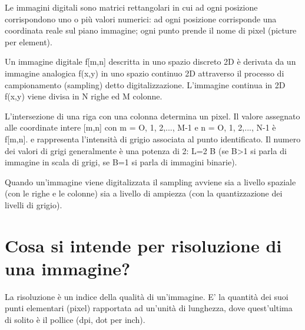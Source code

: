 Le immagini digitali sono matrici rettangolari in cui ad ogni posizione corrispondono uno o più valori numerici: ad ogni posizione corrisponde una coordinata reale sul piano immagine; ogni punto prende il nome di pixel (picture per element).

Un immagine digitale f[m,n] descritta in uno spazio discreto 2D è derivata da un immagine analogica f(x,y) in uno spazio continuo 2D attraverso il processo di campionamento (sampling) detto digitalizzazione. L'immagine continua in 2D f(x,y) viene divisa in N righe ed M colonne.

L'intersezione di una riga con una colonna determina un pixel. Il valore assegnato alle coordinate intere [m,n] con {m = O, 1, 2,..., M-1} e {n = O, 1, 2,..., N-1} è f[m,n]. e rappresenta l'intensità di grigio associata al punto identificato. Il numero dei valori di grigi generalmente è una potenza di 2: L=2 B (se B>1 si parla di immagine in scala di grigi, se B=1 si parla di immagini binarie).

Quando un'immagine viene digitalizzata il sampling avviene sia a livello spaziale (con le righe e le colonne) sia a livello di ampiezza (con la quantizzazione dei livelli di grigio).

\section{Cosa si intende per risoluzione di una immagine?}
La risoluzione è un indice della qualità di un'immagine. E' la quantità dei suoi punti elementari (pixel) rapportata ad un'unità di lunghezza, dove quest'ultima di solito è il pollice (dpi, dot per inch).


